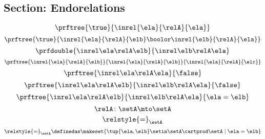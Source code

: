\begin{forslides}
    \subsection{Section: Endorelations}

    \begin{equation}
        \label{eq:slides_session2_rel_139}
        \prftree{\true}{\inrel{\ela}{\relA}{\ela}}
    \end{equation}
    \begin{equation}
        \label{eq:slides_session2_rel_140}
        \prftree{\true}{\inrel{\ela}{\relA}{\elb} \boolor \inrel{\elb}{\relA}{\ela}}
    \end{equation}
    \begin{equation}
        \label{eq:slides_session2_rel_141}
        \prfdouble{
            \inrel \ela \relA \elb
        }{
            \inrel \elb \relA \ela
        }
    \end{equation}
    \begin{equation}
        \label{eq:slides_session2_rel_142}
        \prftree{\inrel{\ela}{\relA}{\elb}}{\inrel{\ela}{\relA}{\elb}}{\inrel{\ela}{\relA}{\elc}}
    \end{equation}
    \begin{equation}
        \label{eq:slides_session2_rel_143}
        \prftree{
            \inrel \ela \relA \ela
        }{
            \false
        }
    \end{equation}
    \begin{equation}
        \label{eq:slides_session2_rel_144}
        \prftree{
            \inrel \ela \relA \elb
        }{
            \inrel \elb \relA \ela
        }{
            \false
        }
    \end{equation}
    \begin{equation}
        \label{eq:slides_session2_rel_145}
        \prftree{
            \inrel \ela \relA \elb
        }{
            \inrel \elb \relA \ela
        }{
            \ela = \elb
        }
    \end{equation}
    \begin{equation}
        \label{eq:slides_session2_rel_146}
        \relA\colon \setA \mto \setA
    \end{equation}
    \begin{equation}
        \label{eq:slides_session2_rel_147}
        \relstyle{=}_\setA
    \end{equation}
    \begin{equation}
        \label{eq:slides_session2_rel_148}
        \relstyle{=}_\setA \definedas \makeset{\tup{\ela,\elb}\setin \setA\cartprod \setA \mid \ela=\elb}

\end{equation}
\end{forslides}
